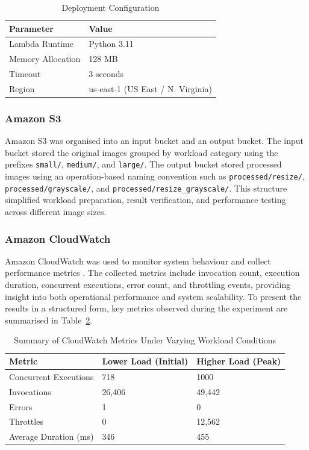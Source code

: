 \documentclass[11pt,a4paper,twocolumn]{article}
\begin{document}
\begin{table}[!htbp]
\centering


\begin{tabularx}{\columnwidth}{X X}
\toprule
Parameter & Value \\
\midrule
Lambda Runtime & Python 3.11 \\
Memory Allocation & 128 MB \\
Timeout & 3 seconds \\
Region & us-east-1 (US East / N. Virginia) \\
\bottomrule
\end{tabularx}

\caption{Deployment Configuration}
\label{tab:deployment}
\end{table}

\subsubsection{Amazon S3}

Amazon S3 was organised into an input bucket and an output bucket. 
The input bucket stored the original images grouped by workload category using the prefixes \texttt{small/}, 
\texttt{medium/}, and \texttt{large/}. 
The output bucket stored processed images using an operation-based naming convention such as 
\texttt{processed/resize/}, \texttt{processed/grayscale/}, and \texttt{processed/resize\_grayscale/}. 
This structure simplified workload preparation, result verification, and performance testing across 
different image sizes.


\subsubsection{Amazon CloudWatch}

Amazon CloudWatch was used to monitor system behaviour and collect performance metrics \citep{aws_cloudwatch_docs}. 
The collected metrics include invocation count, execution duration, concurrent executions, error count, and 
throttling events, providing insight into both operational performance and system scalability.
To present the results in a structured form, key metrics observed during the experiment are summarised in 
Table~\ref{tab:cloudwatch_metrics}.



\begin{table}[t]
\centering

\begin{tabularx}{\textwidth}{X X X}
\toprule
Metric & Lower Load (Initial) & Higher Load (Peak) \\
\midrule
Concurrent Executions & 718 & 1000 \\
Invocations & 26,406 & 49,442 \\
Errors & 1 & 0 \\
Throttles & 0 & 12,562 \\
Average Duration (ms) & 346 & 455 \\
\bottomrule
\end{tabularx}

\caption{Summary of CloudWatch Metrics Under Varying Workload Conditions}
\label{tab:cloudwatch_metrics}
\end{table}
\end{document}
